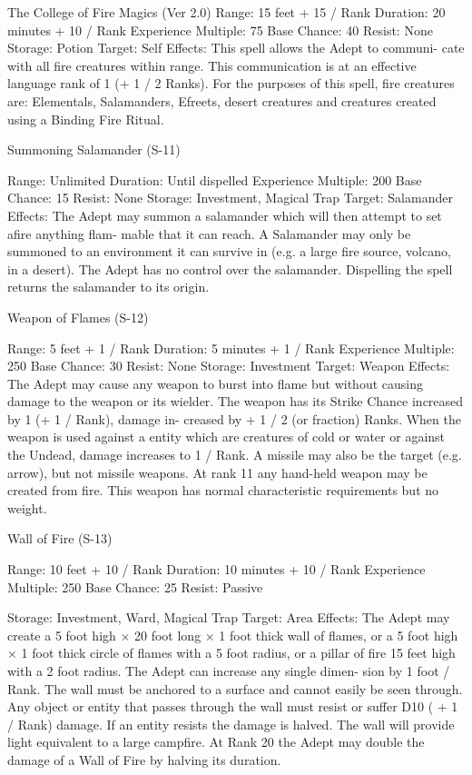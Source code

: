 \begin{Chapter}{The College of Fire Magics (Ver 2.0)}
Range: 15 feet + 15 / Rank 
Duration: 20 minutes + 10 / Rank 
Experience Multiple: 75 
Base Chance: 40%
Resist: None 
Storage: Potion 
Target: Self 
Effects:  This  spell  allows  the  Adept  to  communi-
cate  with  all  fire  creatures  within  range.  This 
communication is  at an  effective  language  rank  of 
1  (+  1  /  2  Ranks).  For  the  purposes  of  this  spell, 
fire  creatures  are:  Elementals,  Salamanders, 
Efreets,  desert  creatures  and  creatures  created 
using a Binding Fire Ritual. 

Summoning Salamander (S-11) 

Range: Unlimited 
Duration: Until dispelled 
Experience Multiple: 200 
Base Chance: 15%
Resist: None 
Storage: Investment, Magical Trap 
Target: Salamander 
Effects:  The  Adept  may  summon  a  salamander 
which will then attempt to set afire anything flam-
mable that it can reach. A Salamander may only be 
summoned to an environment it can survive in (e.g. 
a large fire source, volcano, in a desert). The Adept 
has no control over the salamander. Dispelling the 
spell returns the salamander to its origin. 

Weapon of Flames (S-12) 

Range: 5 feet + 1 / Rank 
Duration: 5 minutes + 1 / Rank 
Experience Multiple: 250 
Base Chance: 30%
Resist: None 
Storage: Investment 
Target: Weapon 
Effects: The Adept may cause any weapon to burst 
into  flame  but  without  causing  damage  to  the 
weapon  or  its  wielder.  The  weapon  has  its  Strike 
Chance  increased  by  1  (+  1  /  Rank),  damage  in-
creased  by  +  1  /  2  (or  fraction)  Ranks.  When  the 
weapon is used against a entity which are creatures 
of  cold  or  water  or  against  the  Undead,  damage 
increases  to  1  /  Rank.  A  missile  may  also  be  the 
target  (e.g.  arrow),  but  not  missile  weapons.  At 
rank  11  any  hand-held  weapon  may  be  created 
from  fire.  This  weapon  has  normal  characteristic 
requirements but no weight. 

Wall of Fire (S-13) 

Range: 10 feet + 10 / Rank 
Duration: 10 minutes + 10 / Rank 
Experience Multiple: 250 
Base Chance: 25%
Resist: Passive 

Storage: Investment, Ward, Magical Trap 
Target: Area 
Effects:  The  Adept  may  create  a  5  foot  high  ×  20 
foot long × 1 foot thick wall of flames, or a 5 foot 
high  ×  1  foot  thick  circle  of  flames  with  a  5  foot 
radius, or a pillar of fire 15 feet high with a 2 foot 
radius.  The  Adept  can  increase  any  single  dimen-
sion by  1  foot  /  Rank.  The  wall  must  be  anchored 
to a surface and cannot easily be seen through. Any 
object  or  entity  that  passes  through  the  wall  must 
resist  or  suffer  D10  (  +  1  /  Rank)  damage.  If  an 
entity  resists  the  damage  is  halved.  The  wall  will 
provide  light  equivalent  to  a  large  campfire.  At 
Rank  20  the  Adept  may  double  the  damage  of  a 
Wall of Fire by halving its duration. 


\end{Chapter}

